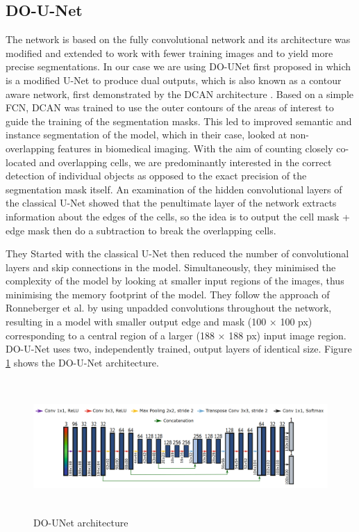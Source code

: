 \documentclass[conference]{IEEEtran}
\begin{document}
\subsection{DO-U-Net}
The network is based on the fully convolutional network and its architecture was modified and extended to work with fewer training images and to yield more precise segmentations. In our case we are using DO-UNet first proposed in \cite{10.1007/978-3-030-44584-3_31} which is a modified U-Net to produce dual outputs, which is also known as a contour aware network, first demonstrated by the DCAN architecture \cite{chen2016dcan}. Based on a simple FCN, DCAN was trained to use the outer
contours of the areas of interest to guide the training of the segmentation masks. This led to improved semantic and instance segmentation of the model, which in their case, looked at non-overlapping features in biomedical imaging.
With the aim of counting closely co-located and overlapping cells, we are predominantly interested in the correct detection of individual objects as
opposed to the exact precision of the segmentation mask itself. An examination of the hidden convolutional layers of the classical U-Net showed that the penultimate layer of the network extracts information about the edges of the cells, so the idea is to output the cell mask + edge mask then do a subtraction to break the overlapping cells.

They Started with the classical U-Net then reduced the number of convolutional layers and skip connections in the model. Simultaneously, they minimised the complexity of the model by looking at smaller input regions of the images, thus minimising the memory footprint of the model. They follow the approach of Ronneberger et al. \cite{10.1007/978-3-030-44584-3_31} by using unpadded convolutions throughout the network, resulting in a model with smaller output edge and mask (100 × 100 px) corresponding to a central region of a larger (188 × 188 px) input image region. DO-U-Net uses two, independently trained, output layers of identical size. Figure \ref{fig:DO-UNET} shows the DO-U-Net architecture.

\begin{figure}
\centering
  \vspace{0.2in}
    \centerline{\includegraphics[width = \linewidth,height=2in]{images/DO-UNET.png}}
    \caption{DO-UNet architecture}
    \label{fig:DO-UNET}
\end{figure}
\end{document}
